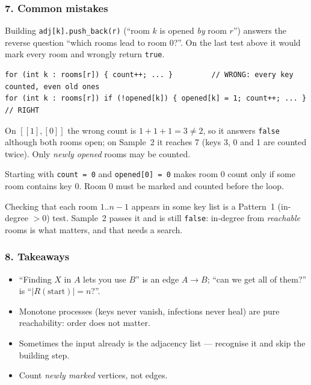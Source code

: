 \subsubsection*{7. Common mistakes}

\begin{warningbox}
Building \texttt{adj[k].push\_back(r)} (``room $k$ is opened \emph{by} room $r$'') answers the reverse question ``which rooms lead to room 0?''. On the last test above it would mark every room and wrongly return \texttt{true}.
\end{warningbox}

\begin{warningbox}
\begin{lstlisting}[style=snippet]
for (int k : rooms[r]) { count++; ... }         // WRONG: every key counted, even old ones
for (int k : rooms[r]) if (!opened[k]) { opened[k] = 1; count++; ... }   // RIGHT
\end{lstlisting}
On $[[1],[0]]$ the wrong count is $1 + 1 + 1 = 3 \ne 2$, so it answers \texttt{false} although both rooms open; on Sample~2 it reaches 7 (keys 3, 0 and 1 are counted twice). Only \emph{newly opened} rooms may be counted.
\end{warningbox}

\begin{warningbox}
Starting with \texttt{count = 0} and \texttt{opened[0] = 0} makes room 0 count only if some room contains key 0. Room 0 must be marked and counted before the loop.
\end{warningbox}

\begin{warningbox}
Checking that each room $1..n{-}1$ appears in some key list is a Pattern~1 (in-degree $>0$) test. Sample~2 passes it and is still \texttt{false}: in-degree from \emph{reachable} rooms is what matters, and that needs a search.
\end{warningbox}

\subsubsection*{8. Takeaways}

\begin{itemize}[leftmargin=*]
    \item ``Finding $X$ in $A$ lets you use $B$'' is an edge $A \to B$; ``can we get all of them?'' is ``$|R(\text{start})| = n$?''.
    \item Monotone processes (keys never vanish, infections never heal) are pure reachability: order does not matter.
    \item Sometimes the input already is the adjacency list --- recognise it and skip the building step.
    \item Count \emph{newly marked} vertices, not edges.
\end{itemize}

